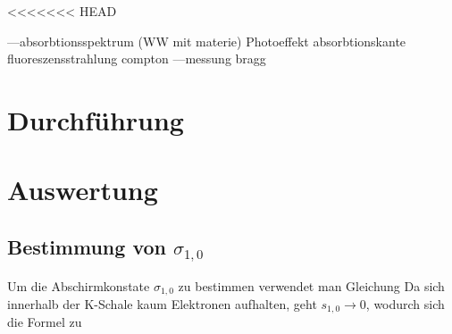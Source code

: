 <<<<<<< HEAD
\newpage

---absorbtionsspektrum (WW mit materie)
Photoeffekt
absorbtionskante
fluoreszensstrahlung
compton
---messung
bragg
\section{Durchführung}

\section{Auswertung}
\subsection{Bestimmung von $\sigma_{1,0}$}
Um die Abschirmkonstate $\sigma_{1,0}$ zu bestimmen verwendet man Gleichung %
Da sich innerhalb der K-Schale kaum Elektronen aufhalten, geht $s_{1,0}\rightarrow 0$, wodurch sich die Formel zu
